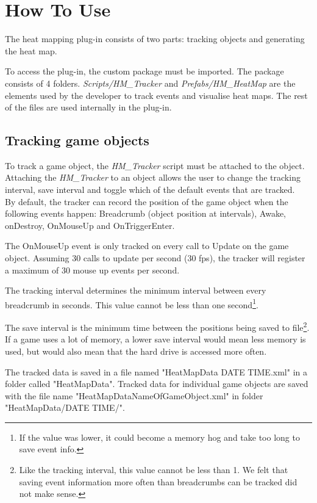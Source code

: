 \section{How To Use}
\label{HowToUse}
The heat mapping plug-in consists of two parts: tracking objects and generating the heat map.

To access the plug-in, the custom package must be imported. The package consists of 4 folders. \textit{Scripts/HM\_Tracker} and \textit{Prefabs/HM\_HeatMap} are the elements used by the developer to track events and visualise heat maps. The rest of the files are used internally in the plug-in.

\subsection{Tracking game objects}
\label{HowToUse_Tracking}
To track a game object, the \textit{HM\_Tracker} script must be attached to the object. Attaching the \textit{HM\_Tracker} to an object allows the user to change the tracking interval, save interval and toggle which of the default events that are tracked.
\\By default, the tracker can record the position of the game object when the following events happen: Breadcrumb (object position at intervals), Awake, onDestroy, OnMouseUp and OnTriggerEnter.


The OnMouseUp event is only tracked on every call to Update on the game object. Assuming 30 calls to update per second (30 fps), the tracker will register a maximum of 30 mouse up events per second.

The tracking interval determines the minimum interval between every breadcrumb in seconds. This value cannot be less than one second\footnote{If the value was lower, it could become a memory hog and take too long to save event info.}.

The save interval is the minimum time between the positions being saved to file\footnote{Like the tracking interval, this value cannot be less than 1. We felt that saving event information more often than breadcrumbs can be tracked did not make sense.}. 
If a game uses a lot of memory, a lower save interval would mean less memory is used, but would also mean that the hard drive is accessed more often.

The tracked data is saved in a file named "HeatMapData DATE TIME.xml" in a folder called "HeatMapData". Tracked data for individual game objects are saved with the file name "HeatMapDataNameOfGameObject.xml" in folder "HeatMapData/DATE TIME/".

